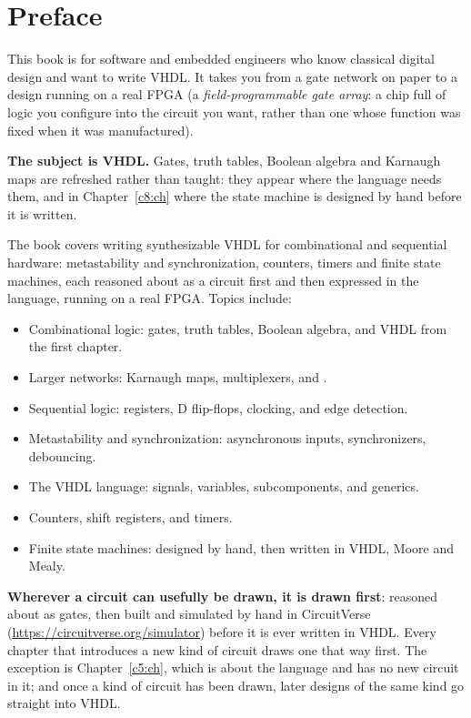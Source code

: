 
\chapter{Preface}

This book is for software and embedded engineers who know classical digital design and want to
write VHDL. It takes you from a gate network on paper to a design running on a real FPGA (a
\emph{field-programmable gate array}: a chip full of logic you configure into the circuit you want,
rather than one whose function was fixed when it was manufactured).

\textbf{The subject is VHDL.} Gates, truth tables, Boolean algebra and Karnaugh maps are refreshed
rather than taught: they appear where the language needs them, and in Chapter~\ref{c8:ch} where the
state machine is designed by hand before it is written.

The book covers writing synthesizable VHDL for combinational and sequential hardware:
metastability and synchronization, counters, timers and finite state machines, each reasoned about
as a circuit first and then expressed in the language, running on a real FPGA. Topics include:
\begin{itemize}
  \item Combinational logic: gates, truth tables, Boolean algebra, and VHDL from the first chapter.
  \item Larger networks: Karnaugh maps, multiplexers,  and .
  \item Sequential logic: registers, D flip-flops, clocking, and edge detection.
  \item Metastability and synchronization: asynchronous inputs, synchronizers, debouncing.
  \item The VHDL language: signals, variables, subcomponents, and generics.
  \item Counters, shift registers, and timers.
  \item Finite state machines: designed by hand, then written in VHDL, Moore and Mealy.
\end{itemize}

\textbf{Wherever a circuit can usefully be drawn, it is drawn first}: reasoned about as gates, then
built and simulated by hand in CircuitVerse (\url{https://circuitverse.org/simulator}) before it is
ever written in VHDL. Every chapter that introduces a new kind of circuit draws one that way first.
The exception is Chapter~\ref{c5:ch}, which is about the language and has no new circuit in it; and
once a kind of circuit has been drawn, later designs of the same kind go straight into VHDL.

